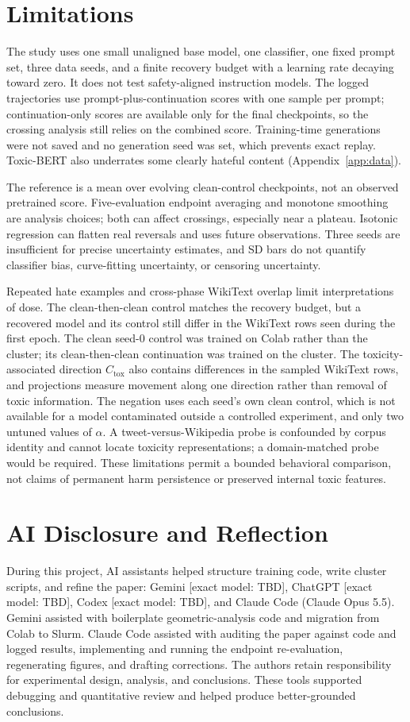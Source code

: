 \documentclass[11pt,a4paper]{article}
\begin{document}
\section*{Limitations}
The study uses one small unaligned base model, one classifier, one fixed prompt set, three data seeds, and a finite recovery budget with a learning rate decaying toward zero. It does not test safety-aligned instruction models. The logged trajectories use prompt-plus-continuation scores with one sample per prompt; continuation-only scores are available only for the final checkpoints, so the crossing analysis still relies on the combined score. Training-time generations were not saved and no generation seed was set, which prevents exact replay. Toxic-BERT also underrates some clearly hateful content (Appendix~\ref{app:data}).

The reference is a mean over evolving clean-control checkpoints, not an observed pretrained score. Five-evaluation endpoint averaging and monotone smoothing are analysis choices; both can affect crossings, especially near a plateau. Isotonic regression can flatten real reversals and uses future observations. Three seeds are insufficient for precise uncertainty estimates, and SD bars do not quantify classifier bias, curve-fitting uncertainty, or censoring uncertainty.

Repeated hate examples and cross-phase WikiText overlap limit interpretations of dose. The clean-then-clean control matches the recovery budget, but a recovered model and its control still differ in the WikiText rows seen during the first epoch. The clean seed-0 control was trained on Colab rather than the cluster; its clean-then-clean continuation was trained on the cluster. The toxicity-associated direction $C_{\mathrm{tox}}$ also contains differences in the sampled WikiText rows, and projections measure movement along one direction rather than removal of toxic information. The negation uses each seed's own clean control, which is not available for a model contaminated outside a controlled experiment, and only two untuned values of $\alpha$. A tweet-versus-Wikipedia probe is confounded by corpus identity and cannot locate toxicity representations; a domain-matched probe would be required. These limitations permit a bounded behavioral comparison, not claims of permanent harm persistence or preserved internal toxic features.

\section*{AI Disclosure and Reflection}
During this project, AI assistants helped structure training code, write cluster scripts, and refine the paper: Gemini [exact model: TBD], ChatGPT [exact model: TBD], Codex [exact model: TBD], and Claude Code (Claude Opus 5.5). Gemini assisted with boilerplate geometric-analysis code and migration from Colab to Slurm. Claude Code assisted with auditing the paper against code and logged results, implementing and running the endpoint re-evaluation, regenerating figures, and drafting corrections. The authors retain responsibility for experimental design, analysis, and conclusions. These tools supported debugging and quantitative review and helped produce better-grounded conclusions.
\end{document}
